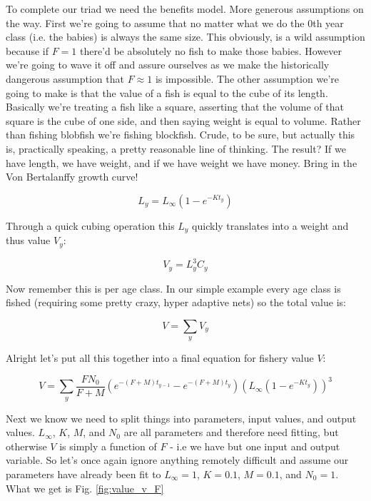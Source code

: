 \documentclass[11pt,a5paper]{book}
\begin{document}
To complete our triad we need the benefits model. More generous assumptions on the way. First we're going to assume that no matter what we do the 0th year class (i.e. the babies) is always the same size. This obviously, is a wild assumption because if $F=1$ there'd be absolutely no fish to make those babies. However we're going to wave it off and assure ourselves as we make the historically dangerous assumption that $F\approx 1$ is impossible. The other assumption we're going to make is that the value of a fish is equal to the cube of its length. Basically we're treating a fish like a square, asserting that the volume of that square is the cube of one side, and then saying weight is equal to volume. Rather than fishing blobfish we're fishing blockfish. Crude, to be sure, but actually this is, practically speaking, a pretty reasonable line of thinking. The result? If we have length, we have weight, and if we have weight we have money. Bring in the Von Bertalanffy growth curve!

$$L_y = L_{\infty}(1-e^{-Kt_y})$$

Through a quick cubing operation this $L_y$ quickly translates into a weight and thus value $V_y$:

$$V_y = L_y^3C_y$$

Now remember this is per age class. In our simple example every age class is fished (requiring some pretty crazy, hyper adaptive nets) so the total value is:

$$V = \sum_y V_y$$

Alright let's put all this together into a final equation for fishery value $V$:

$$V = \sum_y \frac{FN_0}{F+M}(e^{-(F+M)t_{y-1}}- e^{-(F+M)t_y})(L_{\infty}(1-e^{-Kt_y}))^3$$

Next we know we need to split things into parameters, input values, and output values. $L_\infty$, $K$, $M$, and $N_0$ are all parameters and therefore need fitting, but otherwise $V$ is simply a function of $F$ - i.e we have but one input and output variable. So let's once again ignore anything remotely difficult and assume our parameters have already been fit to $L_\infty=1$, $K=0.1$, $M=0.1$, and $N_0=1$. What we get is Fig. \ref{fig:value_v_F}
\newline
\end{document}
